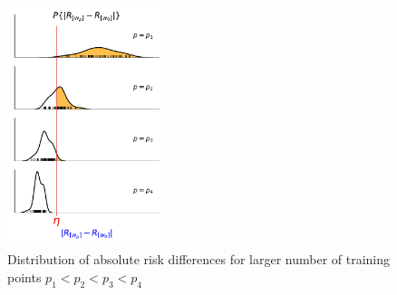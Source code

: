 \begin{frame}
    \begin{figure}
		\includegraphics[height=7cm]{img/PdeltaReta}
        \caption{Distribution of absolute risk differences for larger number of training points $p_{1} < p_{2} < p_{3} < p_{4}$}
	\end{figure}
\end{frame}

